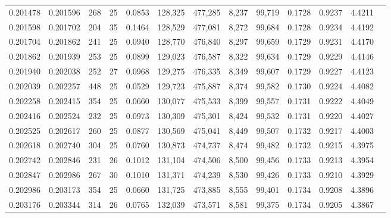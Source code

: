\begin{tabular}{rrrrrrrrrrrrr}
0.201478 & 0.201596 &   268 &  25 &                                     0.0853 & 128,325 & 477,285 &   8,237 &  99,719 & 0.1728 & 0.9237 & 4.4211 \\
0.201598 & 0.201702 &   204 &  35 &                                     0.1464 & 128,529 & 477,081 &   8,272 &  99,684 & 0.1728 & 0.9234 & 4.4192 \\
0.201704 & 0.201862 &   241 &  25 &                                     0.0940 & 128,770 & 476,840 &   8,297 &  99,659 & 0.1729 & 0.9231 & 4.4170 \\
0.201862 & 0.201939 &   253 &  25 &                                     0.0899 & 129,023 & 476,587 &   8,322 &  99,634 & 0.1729 & 0.9229 & 4.4146 \\
0.201940 & 0.202038 &   252 &  27 &                                     0.0968 & 129,275 & 476,335 &   8,349 &  99,607 & 0.1729 & 0.9227 & 4.4123 \\
0.202039 & 0.202257 &   448 &  25 &                                     0.0529 & 129,723 & 475,887 &   8,374 &  99,582 & 0.1730 & 0.9224 & 4.4082 \\
0.202258 & 0.202415 &   354 &  25 &                                     0.0660 & 130,077 & 475,533 &   8,399 &  99,557 & 0.1731 & 0.9222 & 4.4049 \\
0.202416 & 0.202524 &   232 &  25 &                                     0.0973 & 130,309 & 475,301 &   8,424 &  99,532 & 0.1731 & 0.9220 & 4.4027 \\
0.202525 & 0.202617 &   260 &  25 &                                     0.0877 & 130,569 & 475,041 &   8,449 &  99,507 & 0.1732 & 0.9217 & 4.4003 \\
0.202618 & 0.202740 &   304 &  25 &                                     0.0760 & 130,873 & 474,737 &   8,474 &  99,482 & 0.1732 & 0.9215 & 4.3975 \\
0.202742 & 0.202846 &   231 &  26 &                                     0.1012 & 131,104 & 474,506 &   8,500 &  99,456 & 0.1733 & 0.9213 & 4.3954 \\
0.202847 & 0.202986 &   267 &  30 &                                     0.1010 & 131,371 & 474,239 &   8,530 &  99,426 & 0.1733 & 0.9210 & 4.3929 \\
0.202986 & 0.203173 &   354 &  25 &                                     0.0660 & 131,725 & 473,885 &   8,555 &  99,401 & 0.1734 & 0.9208 & 4.3896 \\
0.203176 & 0.203344 &   314 &  26 &                                     0.0765 & 132,039 & 473,571 &   8,581 &  99,375 & 0.1734 & 0.9205 & 4.3867 \\

\end{tabular}
